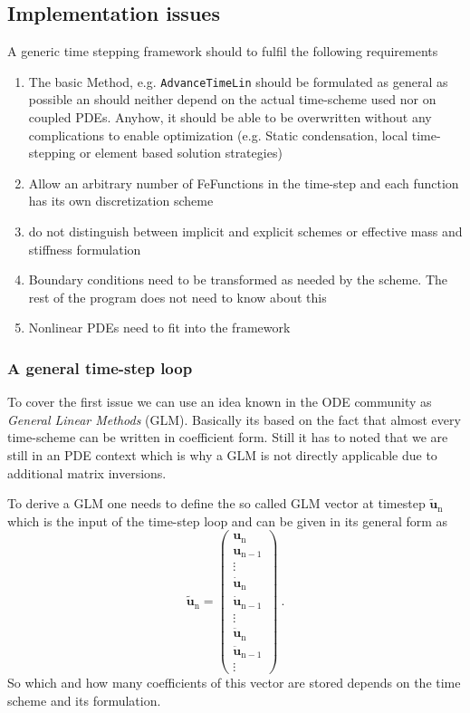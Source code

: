 \subsection{Implementation issues}
A generic time stepping framework should to fulfil the following requirements
\begin{enumerate}
\item The basic Method, e.g. \verb+AdvanceTimeLin+ should be formulated as general as possible an
should neither depend on the actual time-scheme used nor on coupled PDEs. Anyhow, it should be able
to be overwritten without any complications to enable optimization (e.g. Static condensation,
local time-stepping or element based solution strategies)
\item Allow an arbitrary number of FeFunctions in the time-step and each function has its own
discretization scheme
\item do not distinguish between implicit and explicit schemes or effective mass and stiffness
formulation
\item Boundary conditions need to be transformed as needed by the scheme. The rest of the program
does not need to know about this
\item Nonlinear PDEs need to fit into the framework
\end{enumerate}

\subsubsection{A general time-step loop}
To cover the first issue we can use an idea known in the ODE community as {\it General Linear
Methods} (GLM). Basically its based on the fact that almost every time-scheme can be written in
coefficient form. Still it has to noted that we are still in an PDE context which is why a GLM is
not directly applicable due to additional matrix inversions.

To derive a GLM one needs to define the so called GLM vector at timestep $\mathbf{\tilde{u}}_\mathrm{n}$ which is
the input of the time-step loop and can be given in its
general form as
\begin{equation}
\mathbf{\tilde{u}}_\mathrm{n} = \left( \begin{array}{c} \mathbf{u}_{\mathrm{n}} \\  \mathbf{u}_{\mathrm{n}-1} \\ \vdots \\
\mathbf{\dot{u}}_{\mathrm{n}} \\ \mathbf{\dot{u}}_{\mathrm{n}-1} \\ \vdots \\ \mathbf{\ddot{u}}_{\mathrm{n}} \\
\mathbf{\ddot{u}}_{\mathrm{n}-1} \\ \vdots \end{array}\right)\ .
\end{equation}
So which and how many coefficients of this vector are stored depends on the time scheme and its
formulation. 

